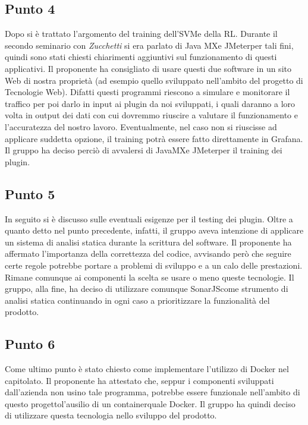         \subsection{Punto 4}
            Dopo si è trattato l'argomento del training dell'SVM\glosp e della RL\glo. Durante il secondo seminario con \textit{Zucchetti} si era parlato di Java MX\glosp e JMeter\glosp per tali fini, quindi sono stati chiesti chiarimenti aggiuntivi sul funzionamento di questi applicativi. Il proponente ha consigliato di usare questi due software in un sito Web di nostra proprietà (ad esempio quello sviluppato nell'ambito del progetto di Tecnologie Web). Difatti questi programmi riescono a simulare e monitorare il traffico per poi darlo in input ai plugin da noi sviluppati, i quali daranno a loro volta in output dei dati con cui dovremmo riuscire a valutare il funzionamento e l'accuratezza del nostro lavoro. Eventualmente, nel caso non si riuscisse ad applicare suddetta opzione, il training potrà essere fatto direttamente in Grafana\glo. Il gruppo ha deciso perciò di avvalersi di JavaMX\glosp e JMeter\glosp per il training dei plugin.
        \subsection{Punto 5}
            In seguito si è discusso sulle eventuali esigenze per il testing dei plugin. Oltre a quanto detto nel punto precedente, infatti, il gruppo aveva intenzione di applicare un sistema di analisi statica durante la scrittura del software. Il proponente ha affermato l'importanza della correttezza del codice, avvisando però che seguire certe regole potrebbe portare a problemi di sviluppo e a un calo delle prestazioni. Rimane comunque ai componenti la scelta se usare o meno queste tecnologie. Il gruppo, alla fine, ha deciso di utilizzare comunque SonarJS\glosp come strumento di analisi statica continuando in ogni caso a prioritizzare la funzionalità del prodotto\glo.
        \subsection{Punto 6}
            Come ultimo punto è stato chiesto come implementare l'utilizzo di Docker nel capitolato\glo. Il proponente ha attestato che, seppur i componenti sviluppati dall'azienda non usino tale programma, potrebbe essere funzionale nell'ambito di questo progetto\glosp l'ausilio di un container\glosp quale Docker. Il gruppo ha quindi deciso di utilizzare questa tecnologia nello sviluppo del prodotto\glo.
